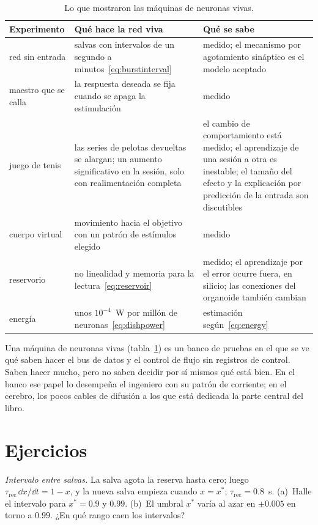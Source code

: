 \begin{table}[t]
\centering
\footnotesize
\setlength{\tabcolsep}{4pt}
\renewcommand{\arraystretch}{1.15}
\begin{tabular}{>{\raggedright}p{2.8cm}>{\raggedright}p{4.2cm}>{\raggedright\arraybackslash}p{5.8cm}}
\toprule
Experimento & Qué hace la red viva & Qué se sabe \\
\midrule
red sin entrada & salvas con intervalos de un segundo a minutos~\eqref{eq:burstinterval} & medido; el mecanismo por agotamiento sináptico es el modelo aceptado \\
maestro que se calla & la respuesta deseada se fija cuando se apaga la estimulación & medido \\
juego de tenis & las series de pelotas devueltas se alargan; un aumento significativo en la sesión, solo con realimentación completa & el cambio de comportamiento está medido; el aprendizaje de una sesión a otra es inestable; el tamaño del efecto y la explicación por predicción de la entrada son discutibles \\
cuerpo virtual & movimiento hacia el objetivo con un patrón de estímulos elegido & medido \\
reservorio & no linealidad y memoria para la lectura~\eqref{eq:reservoir} & medido; el aprendizaje por el error ocurre fuera, en silicio; las conexiones del organoide también cambian \\
energía & unos $10^{-4}$~W por millón de neuronas~\eqref{eq:dishpower} & estimación según~\eqref{eq:energy} \\
\bottomrule
\end{tabular}
\caption{Lo que mostraron las máquinas de neuronas vivas.}
\label{tab:livingmachine}
\end{table}

Una máquina de neuronas vivas (tabla~\ref{tab:livingmachine}) es un banco de pruebas en el que se ve qué saben hacer el bus de datos y el control de flujo sin registros de control. Saben hacer mucho, pero no saben decidir por sí mismos qué está bien. En el banco ese papel lo desempeña el ingeniero con su patrón de corriente; en el cerebro, los pocos cables de difusión a los que está dedicada la parte central del libro.

\section{Ejercicios}

\begin{exercise}[\lvlA]
\label{ex:21:1}
\emph{Intervalo entre salvas.} La salva agota la reserva hasta cero; luego $\tau_{\text{rec}}\,\dd x/\dd t=1-x$, y la nueva salva empieza cuando $x=x^*$; $\tau_{\text{rec}}=0.8$~s. (a)~Halle el intervalo para $x^*=0.9$ y $0.99$. (b)~El umbral $x^*$ varía al azar en $\pm0.005$ en torno a $0.99$. ¿En qué rango caen los intervalos?
\end{exercise}

